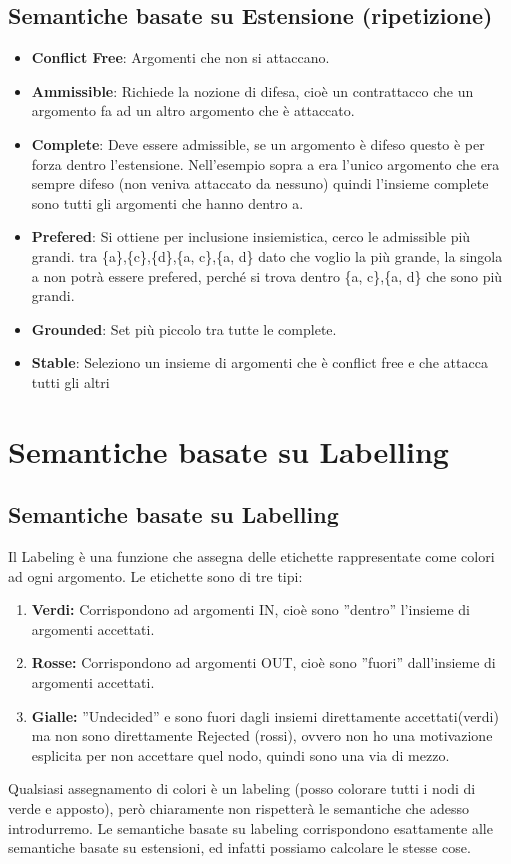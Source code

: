     \section{Semantiche basate su Estensione (ripetizione)}
    \begin{itemize}
        \item \textbf{Conflict Free}: Argomenti che non si attaccano.
        \item \textbf{Ammissible}: Richiede la nozione di difesa, cioè un contrattacco che un argomento fa ad un altro argomento che è attaccato.
        \item \textbf{Complete}: Deve essere admissible, se un argomento è difeso questo è per forza dentro l'estensione. Nell'esempio sopra a era l'unico argomento che era sempre difeso (non veniva attaccato da nessuno) quindi l'insieme complete sono tutti gli argomenti che hanno dentro a.
        \item \textbf{Prefered}: Si ottiene per inclusione insiemistica, cerco le admissible più grandi. tra \{a\},\{c\},\{d\},\{a, c\},\{a, d\} dato che voglio la più grande, la singola {a} non potrà essere prefered, perché si trova dentro \{a, c\},\{a, d\} che sono più grandi.
        \item \textbf{Grounded}: Set più piccolo tra tutte le complete.
        \item \textbf{Stable}: Seleziono un insieme di argomenti che è conflict free e che attacca tutti gli altri
    \end{itemize}

    \chapter{Semantiche basate su Labelling} \label{ch:Semantiche basate su Labelling}
    \section{Semantiche basate su Labelling}
    Il Labeling è una funzione che assegna delle etichette rappresentate come colori ad ogni argomento. Le etichette sono di tre tipi:
    \begin{enumerate}
        \item \textbf{Verdi:} Corrispondono ad argomenti IN, cioè sono ”dentro” l'insieme di argomenti accettati.
        \item \textbf{Rosse:} Corrispondono ad argomenti OUT, cioè sono ”fuori” dall'insieme di argomenti accettati.
        \item \textbf{Gialle:} ”Undecided” e sono fuori dagli insiemi direttamente accettati(verdi) ma non sono direttamente Rejected (rossi), ovvero non ho una motivazione esplicita per non accettare quel nodo, quindi sono una via di mezzo.
    \end{enumerate}
    Qualsiasi assegnamento di colori è un labeling (posso colorare tutti i nodi di verde e apposto), però chiaramente non rispetterà le semantiche che adesso introdurremo. Le semantiche basate su labeling corrispondono esattamente alle semantiche basate su estensioni, ed infatti possiamo calcolare le stesse
    cose.

